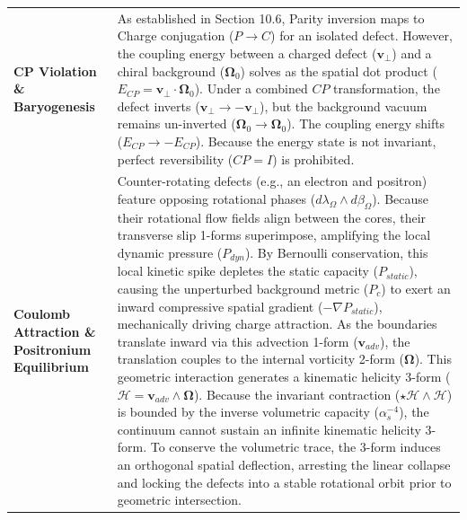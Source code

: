 \begin{longtable}{p{} p{}}
    \textbf{CP Violation \& Baryogenesis} & As established in Section 10.6, Parity inversion maps to Charge conjugation ($P \to C$) for an isolated defect. However, the coupling energy between a charged defect ($\mathbf{v}_\perp$) and a chiral background ($\boldsymbol{\Omega}_0$) solves as the spatial dot product ($E_{CP} = \mathbf{v}_\perp \cdot \boldsymbol{\Omega}_0$). Under a combined $CP$ transformation, the defect inverts ($\mathbf{v}_\perp \to -\mathbf{v}_\perp$), but the background vacuum remains un-inverted ($\boldsymbol{\Omega}_0 \to \boldsymbol{\Omega}_0$). The coupling energy shifts ($E_{CP} \to -E_{CP}$). Because the energy state is not invariant, perfect reversibility ($CP = I$) is prohibited. \\
    \textbf{Coulomb Attraction \& Positronium Equilibrium} & Counter-rotating defects (e.g., an electron and positron) feature opposing rotational phases ($d\lambda_\Omega \wedge d\beta_\Omega$). Because their rotational flow fields align between the cores, their transverse slip 1-forms superimpose, amplifying the local dynamic pressure ($P_{dyn}$). By Bernoulli conservation, this local kinetic spike depletes the static capacity ($P_{static}$), causing the unperturbed background metric ($P_c$) to exert an inward compressive spatial gradient ($-\nabla P_{static}$), mechanically driving charge attraction. As the boundaries translate inward via this advection 1-form ($\mathbf{v}_{adv}$), the translation couples to the internal vorticity 2-form ($\boldsymbol{\Omega}$). This geometric interaction generates a kinematic helicity 3-form ($\mathcal{H} = \mathbf{v}_{adv} \wedge \boldsymbol{\Omega}$). Because the invariant contraction ($\star\mathcal{H} \wedge \mathcal{H}$) is bounded by the inverse volumetric capacity ($\alpha_s^{-4}$), the continuum cannot sustain an infinite kinematic helicity 3-form. To conserve the volumetric trace, the 3-form induces an orthogonal spatial deflection, arresting the linear collapse and locking the defects into a stable rotational orbit prior to geometric intersection. \\ 

\end{longtable}
